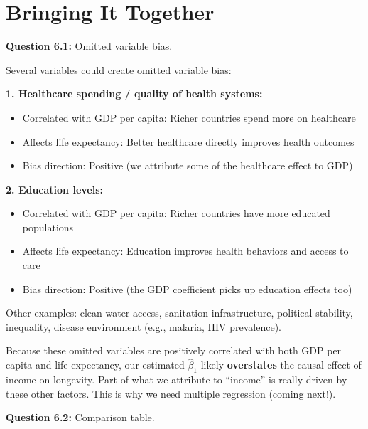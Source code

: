 \documentclass[11pt,letterpaper]{article}
\begin{document}
\newpage

\section{Bringing It Together}

\textbf{Question 6.1:} Omitted variable bias.

\begin{answer}
Several variables could create omitted variable bias:

\textbf{1. Healthcare spending / quality of health systems:}
\begin{itemize}[noitemsep]
\item Correlated with GDP per capita: Richer countries spend more on healthcare
\item Affects life expectancy: Better healthcare directly improves health outcomes
\item Bias direction: Positive (we attribute some of the healthcare effect to GDP)
\end{itemize}

\textbf{2. Education levels:}
\begin{itemize}[noitemsep]
\item Correlated with GDP per capita: Richer countries have more educated populations
\item Affects life expectancy: Education improves health behaviors and access to care
\item Bias direction: Positive (the GDP coefficient picks up education effects too)
\end{itemize}

Other examples: clean water access, sanitation infrastructure, political stability, inequality, disease environment (e.g., malaria, HIV prevalence).

Because these omitted variables are positively correlated with both GDP per capita and life expectancy, our estimated $\hat{\beta}_1$ likely \textbf{overstates} the causal effect of income on longevity. Part of what we attribute to ``income'' is really driven by these other factors. This is why we need multiple regression (coming next!).
\end{answer}

\textbf{Question 6.2:} Comparison table.
\end{document}
